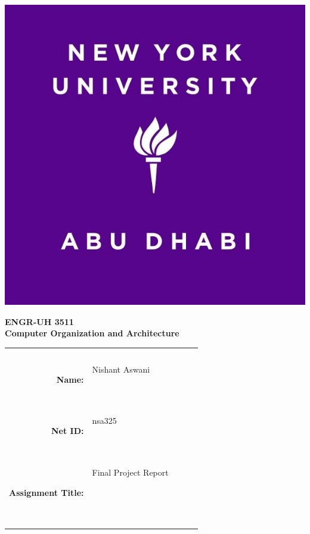 \documentclass[twocolumn]{article}
\title{\myassignmenttitle}
\author{\myname, \myemail}
\affil{\myclassname (\mycoursenumber), Professor \myinstructor}
\date{}
\newcommand{\myname}{Nishant Aswani}
\newcommand{\mynetid}{nsa325}
\newcommand{\myhwtype}{Final Project Report}
\newcommand{\myhwnum}{}
\newcommand{\mycoursenumber}{ENGR-UH 3511}
\newcommand{\myclassname}{Computer Organization and Architecture }
\begin{document}
\onecolumn
\pagestyle{fancy}
\fancyhf{}
\renewcommand{\headrulewidth}{0pt}

\begin{center}
  \includegraphics[scale=0.15]{etc/NYUAD-alt-logo.jpg}
\end{center}

{\vspace{2.5em}}

\begin{center}
    \Huge{\textbf{\mycoursenumber}}\\
    {\vspace{0.5em}}
    \Huge{\textbf{\myclassname}}
\end{center}

{\vspace{10em}}

\begin{center}
  \begin{tabular}{|rp{5.0cm}lll|}
    \hline
    &  &  &  & \\
    &  &  &  & \\
    \Large{\textbf{Name:}} & \Large{\myname}
    
    \  &  &  & \\
    \Large{\textbf{Net ID:}} & \Large{\mynetid}
    
    \  &  &  & \\
    \Large{\textbf{Assignment Title:}} & \Large{\myhwtype \myhwnum}
    
    \
    
    \  &  &  & \\
    \hline
  \end{tabular}
\end{center}
\end{document}
